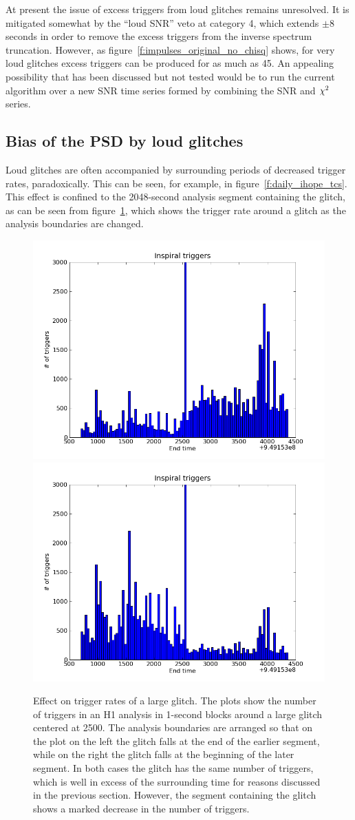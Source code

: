 At present the issue of excess triggers from loud glitches remains
unresolved.  It is mitigated somewhat by the ``loud SNR'' veto at
category 4, which extends $\pm 8$ seconds in order to remove the
excess triggers from the inverse spectrum truncation.  However, as
figure~\ref{f:impulses_original_no_chisq} shows, for very loud
glitches excess triggers can be produced for as much as 45.  An
appealing possibility that has been discussed but not tested would be
to run the current algorithm over a new SNR time series formed by
combining the SNR and $\chi^2$ series.

\subsection{Bias of the PSD by loud glitches}
\label{ssec:sarlacc}

Loud glitches are often accompanied by surrounding periods of
decreased trigger rates, paradoxically.  This can be seen, for
example, in figure~\ref{f:daily_ihope_tcs}.  This effect is confined
to the 2048-second analysis segment containing the glitch, as can be
seen from figure~\ref{f:move_glitch}, which shows the trigger rate
around a glitch as the analysis boundaries are changed.

\begin{figure}
  \includegraphics[width=0.5\linewidth]{figures/detchar/H1-endtime_hist_ORIG}
  \includegraphics[width=0.5\linewidth]{figures/detchar/H1-endtime_hist_RESEG}
  \caption[Effect on trigger rates of a large glitch] {
  \label{f:move_glitch}
Effect on trigger rates of a large glitch.  The plots show the number
of triggers in an H1 analysis in 1-second blocks around a large glitch
centered at 2500.  The analysis boundaries are arranged so that on the
plot on the left the glitch falls at the end of the earlier segment,
while on the right the glitch falls at the beginning of the later
segment.  In both cases the glitch has the same number of triggers, 
which is well in excess of the surrounding time for reasons discussed
in the previous section.  However, the segment containing the glitch
shows a marked decrease in the number of triggers.
}
\end{figure}%

